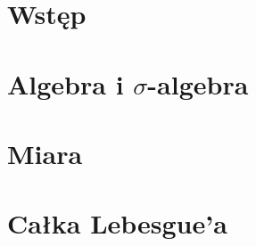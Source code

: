 \section{Wstęp}


\section{Algebra i \texorpdfstring{\(\sigma\)}{sigma}-algebra}


\section{Miara}


\section{Całka Lebesgue'a}

